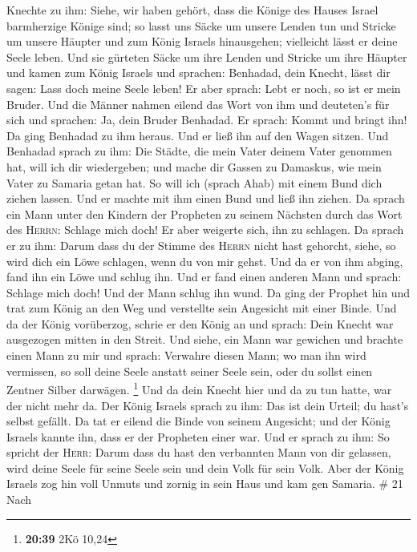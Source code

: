 Knechte zu ihm: Siehe, wir haben gehört, dass die Könige des Hauses
Israel barmherzige Könige sind; so lasst uns Säcke um unsere Lenden tun
und Stricke um unsere Häupter und zum König Israels hinausgehen;
vielleicht lässt er deine Seele leben.  Und sie gürteten
Säcke um ihre Lenden und Stricke um ihre Häupter und kamen zum König
Israels und sprachen: Benhadad, dein Knecht, lässt dir sagen: Lass doch
meine Seele leben! Er aber sprach: Lebt er noch, so ist er mein Bruder.
 Und die Männer nahmen eilend das Wort von ihm und
deuteten's für sich und sprachen: Ja, dein Bruder Benhadad. Er sprach:
Kommt und bringt ihn! Da ging Benhadad zu ihm heraus. Und er ließ ihn
auf den Wagen sitzen.  Und Benhadad sprach zu ihm: Die
Städte, die mein Vater deinem Vater genommen hat, will ich dir
wiedergeben; und mache dir Gassen zu Damaskus, wie mein Vater zu Samaria
getan hat. So will ich (sprach Ahab) mit einem Bund dich ziehen lassen.
Und er machte mit ihm einen Bund und ließ ihn ziehen.  Da
sprach ein Mann unter den Kindern der Propheten zu seinem Nächsten durch
das Wort des \textsc{Herrn}: Schlage mich doch! Er aber weigerte sich,
ihn zu schlagen.  Da sprach er zu ihm: Darum dass du der
Stimme des \textsc{Herrn} nicht hast gehorcht, siehe, so wird dich ein
Löwe schlagen, wenn du von mir gehst. Und da er von ihm abging, fand ihn
ein Löwe und schlug ihn.  Und er fand einen anderen Mann
und sprach: Schlage mich doch! Und der Mann schlug ihn wund.
 Da ging der Prophet hin und trat zum König an den Weg
und verstellte sein Angesicht mit einer Binde.  Und da
der König vorüberzog, schrie er den König an und sprach: Dein Knecht war
ausgezogen mitten in den Streit. Und siehe, ein Mann war gewichen und
brachte einen Mann zu mir und sprach: Verwahre diesen Mann; wo man ihn
wird vermissen, so soll deine Seele anstatt seiner Seele sein, oder du
sollst einen Zentner Silber darwägen. \footnote{\textbf{20:39} 2Kö 10,24}
 Und da dein Knecht hier und da zu tun hatte, war der
nicht mehr da. Der König Israels sprach zu ihm: Das ist dein Urteil; du
hast's selbst gefällt.  Da tat er eilend die Binde von
seinem Angesicht; und der König Israels kannte ihn, dass er der
Propheten einer war.  Und er sprach zu ihm: So spricht
der \textsc{Herr}: Darum dass du hast den verbannten Mann von dir
gelassen, wird deine Seele für seine Seele sein und dein Volk für sein
Volk.  Aber der König Israels zog hin voll Unmuts und
zornig in sein Haus und kam gen Samaria. \# 21  Nach
